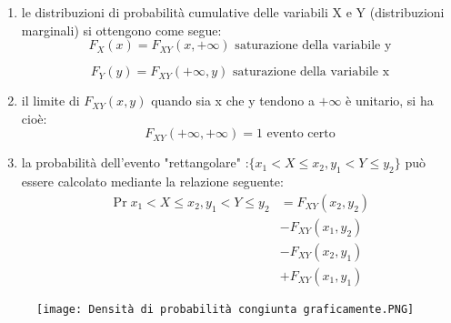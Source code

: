 \begin{enumerate}
    \item le distribuzioni di probabilità cumulative delle variabili X e Y (distribuzioni marginali) si ottengono come segue: 
                {
                    \Large 
                    \begin{equation}
                        F_X (x) = F_{XY} (x, + \infty) 
                        \text{ saturazione della variabile y}
                    \end{equation}
                } 

                {
                    \Large 
                    \begin{equation}
                        F_Y (y) = F_{XY} (+ \infty, y) 
                        \text{ saturazione della variabile x}
                    \end{equation}
                }
    
    \item il limite di $F_{XY} (x, y)$ quando sia x che y tendono a $+ \infty$ è unitario, si ha cioè:
                {
                    \Large 
                    \begin{equation}
                        F_{XY} (+ \infty, + \infty) = 1 
                        \text{ evento certo}
                    \end{equation}
                }
    \item la probabilità dell'evento "rettangolare" :$\{x_1 < X \leq x_2, y_1 < Y \leq y_2\}$ può essere calcolato mediante la relazione seguente: 
                {
                    \Large 
                    \begin{equation} 
                        \begin{split}
                            \Pr{x_1 < X \leq x_2, y_1 < Y \leq y_2}
                            &= 
                            F_{XY} (x_2, y_2) 
                            \\
                            &- F_{XY} (x_1, y_2)
                            \\
                            &-F_{XY} (x_2, y_1) 
                            \\
                            &+ F_{XY} (x_1, y_1)    
                        \end{split}
                    \end{equation}
                }
    
\end{enumerate}

\begin{figure}[h]
    \centering
    \texttt{[image: Densità di probabilità congiunta graficamente.PNG]}
\end{figure} 


